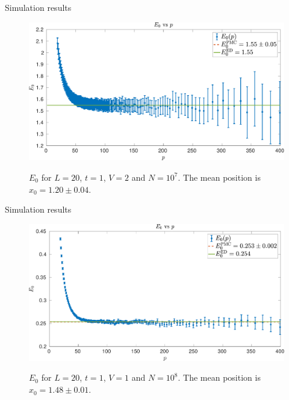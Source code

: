 \documentclass[10pt, compress, protectframetitle, handout]{beamer}
\begin{document}
\begin{frame}{Simulation results}

	\begin{figure}
		\centering
		\includegraphics[width=\textwidth]{Evsp-10E7-V2}
		\label{fig:Evsp-10E7-V2}
		\caption{$E_0$ for $L=20$, $t=1$, $V=2$ and $N=10^7$. The mean position is $x_0 = 1.20 \pm 0.04$.}
	\end{figure}
	
\end{frame}

\begin{frame}{Simulation results}

	\begin{figure}
		\centering
		\includegraphics[width=\textwidth]{Evsp-10E8}
		\label{fig:Evsp-10E8}
		\caption{$E_0$ for $L=20$, $t=1$, $V=1$ and $N=10^8$. The mean position is $x_0 = 1.48 \pm 0.01$.}
	\end{figure}

\end{frame}
	
\end{document}
